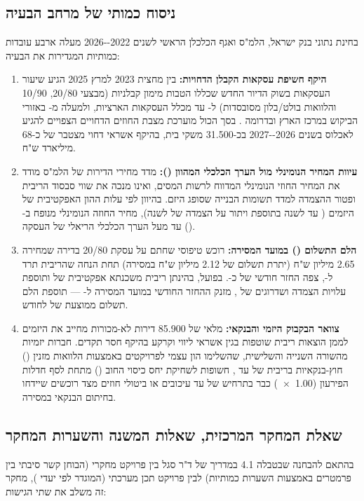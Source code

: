 \subsection{ניסוח כמותי של מרחב הבעיה}
בחינת נתוני בנק ישראל, הלמ"ס ואגף הכלכלן הראשי לשנים \num{2022--2026} \cite{boi2025stability,cbs2026dwellings,mof2025economist} מעלה ארבע עובדות כמותיות המגדירות את הבעיה:
\begin{enumerate}[leftmargin=*, itemsep=3pt]
  \item \textbf{היקף חשיפת עסקאות הקבלן הדחויות:} בין מחצית \num{2023} למרץ \num{2025} הגיע שיעור העסקאות בשוק הדיור החדש שכללו הטבות מימון קבלניות (מבצעי \num{20/80}, \num{10/90} והלוואות בולט/בלון מסובסדות) ל- עד  מכלל העסקאות הארציות, ולמעלה מ- באזורי הביקוש במרכז הארץ ובדרומה \cite{boi2025stability}. בסך הכול מוערכת מצבת החוזים הדחויים הצפויים להגיע לאכלוס בשנים \num{2026--2027} בכ-\num{31,500} משקי בית, בהיקף אשראי דחוי מצטבר של כ-\num{68} מיליארד ש"ח.
  \item \textbf{עיוות המחיר הנומינלי מול הערך הכלכלי המהוון ():} מדד מחירי הדירות של הלמ"ס מודד את המחיר החוזי הנומינלי המדווח לרשות המסים, ואינו מנכה את שווי סבסוד הריבית ופטור ההצמדה למדד תשומות הבנייה שסופג היזם. בהיוון לפי עלות ההון האפקטיבית של היזמים ( עד  לשנה בתוספת ויתור על הצמדה של  לשנה), מחיר החוזה הנומינלי מנופח ב- עד  מעל הערך הכלכלי הריאלי של העסקה ().
  \item \textbf{הלם התשלום () במועד המסירה:} רוכש טיפוסי שחתם על עסקת \num{20/80} בדירה שמחירה \num{2.65} מיליון ש"ח (יתרת תשלום של \num{2.12} מיליון ש"ח במסירה) תחת הנחה שהריבית תרד ל-, צפה החזר חודשי של כ-. בפועל, בהינתן ריבית משכנתא אפקטיבית של  ותוספת עלויות הצמדה ושדרוגים של , מזנק ההחזר החודשי במועד המסירה ל- --- תוספת הלם תשלום ממוצעת של  לחודש.
  \item \textbf{צוואר הבקבוק היזמי והבנקאי:} מלאי של \num{85,900} דירות לא-מכורות מחייב את היזמים לממן הוצאות ריבית שוטפות בגין אשראי ליווי וקרקע בהיקף חסר תקדים. חברות יזמיות מהשורה השנייה והשלישית, שהשלימו הון עצמי לפרויקטים באמצעות הלוואות מזנין () חוץ-בנקאיות בריבית של  עד , חשופות לשחיקת יחס כיסוי החוב () מתחת לסף חדלות הפירעון (\num{1.00x}) כבר בתרחיש של  עד  עיכובים או ביטולי חוזים מצד רוכשים שיידחו בחיתום הבנקאי במסירה.
\end{enumerate}

\subsection{שאלת המחקר המרכזית, שאלות המשנה והשערות המחקר}
בהתאם להבחנה שבטבלה \num{4.1} במדריך של ד"ר סגל \cite{segal2026prep} בין פרויקט מחקרי (הבוחן קשר סיבתי בין פרמטרים באמצעות השערות כמותיות) לבין פרויקט תכן מערכתי (המוגדר לפי יעדי  \cite{doran1981smart}), מחקר זה משלב את שתי הגישות:

